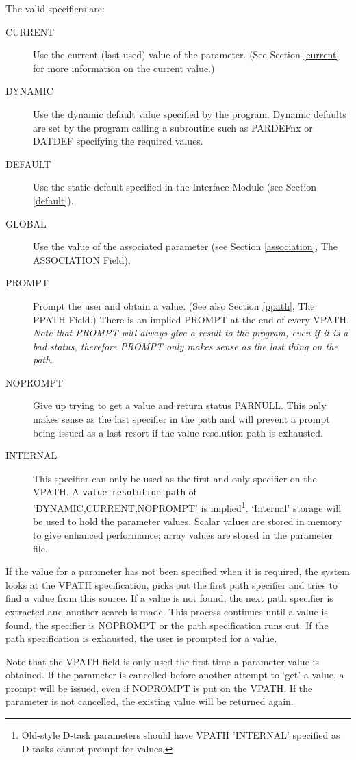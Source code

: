 \documentclass[twoside,11pt]{article}
\renewcommand{\_}{\texttt{\symbol{95}}}
\begin{document}
The valid specifiers are:
\begin{description}
\item[CURRENT] Use the current (last-used) value of the parameter.
(See Section \ref{current} for more information on the current value.)
\item[DYNAMIC] Use the dynamic default value specified by the program.
Dynamic defaults are set by the program calling a subroutine such as
PAR\_DEFnx or DAT\_DEF specifying the required values.
\item[DEFAULT] Use the static default specified in the Interface Module
(see Section \ref{default}).
\item[GLOBAL] Use the value of the associated parameter (see Section
\ref{association}, The ASSOCIATION Field).
\item[PROMPT]  Prompt the user and obtain a value. (See also Section
\ref{ppath}, The PPATH Field.)
There is an implied PROMPT at the end of every VPATH.
{\em Note that PROMPT will always give a result to the program, even if it is
a bad status, therefore PROMPT only makes sense as the last thing on the path.}
\item[NOPROMPT] Give up trying to get a value and return status PAR\_\_NULL.
This only makes sense as the last specifier in the path and will prevent a
prompt being issued as a last resort if the value-resolution-path is exhausted.
\item[INTERNAL] This specifier can only be used as the first and only
specifier on the VPATH. 
A \texttt{value-resolution-path} of 'DYNAMIC,CURRENT,NOPROMPT' is
implied\footnote{Old-style D-task parameters should have VPATH 'INTERNAL' 
specified as D-tasks cannot prompt for values.}.
`Internal' storage will be used to hold the parameter values.
Scalar values are stored in memory to give enhanced performance; array values 
are stored in the parameter file.
\end{description}

If the value for a parameter has not been specified when it is required,
the system looks at the VPATH specification, picks out the first path 
specifier and tries to find a value from this source. 
If a value is not found, the next path
specifier is extracted and another search is made. This process continues
until a value is found, the specifier is NOPROMPT or the path specification 
runs out.
If the path specification is exhausted, the user is prompted for a value.

Note that the VPATH field is only used the first time a parameter value is
obtained. If the parameter is cancelled before another attempt to `get' a
value, a prompt will be issued, even if NOPROMPT is put on the VPATH.
If the parameter is not cancelled, the existing value will be returned again.
\end{document}

